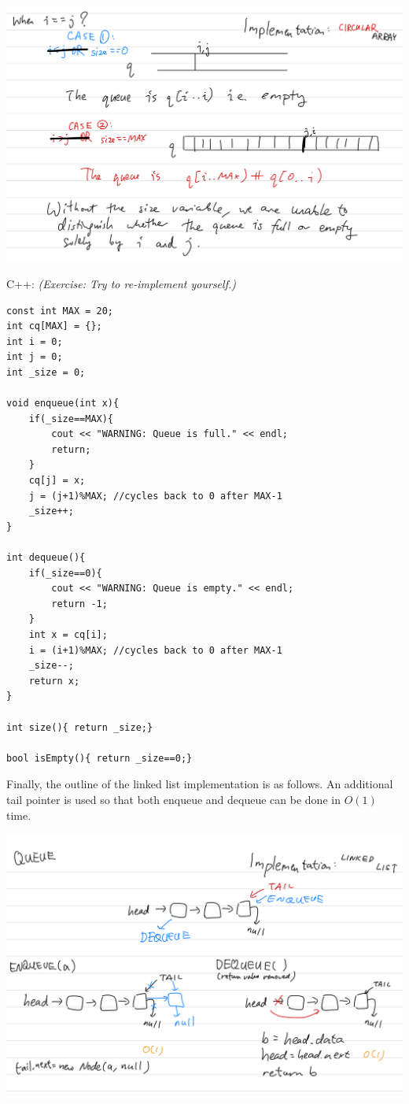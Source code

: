 \includegraphics[width=15cm]{images/ch6-cqij.png}

C++: \textit{(Exercise:  Try to re-implement yourself.)}

\begin{lstlisting}
const int MAX = 20; 
int cq[MAX] = {};
int i = 0;
int j = 0;
int _size = 0;

void enqueue(int x){
    if(_size==MAX){
        cout << "WARNING: Queue is full." << endl;
        return;
    }
    cq[j] = x;
    j = (j+1)%MAX; //cycles back to 0 after MAX-1
    _size++;
}

int dequeue(){
    if(_size==0){
        cout << "WARNING: Queue is empty." << endl;
        return -1;
    }
    int x = cq[i];
    i = (i+1)%MAX; //cycles back to 0 after MAX-1
    _size--;
    return x;
}

int size(){ return _size;}

bool isEmpty(){ return _size==0;}
\end{lstlisting}
\vspace{6mm}

Finally, the outline of the linked list implementation is as follows. An additional tail pointer is used so that both enqueue and dequeue can be done in $O(1)$ time.

\includegraphics[width=15cm]{images/ch6-qlinkedlist.png}